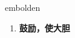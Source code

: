 
\begin{frame}
{\huge embolden}
\begin{center}
\begin{enumerate}\Large
  \item \textbf{鼓励，使大胆}
\end{enumerate}
\end{center}
\end{frame}
